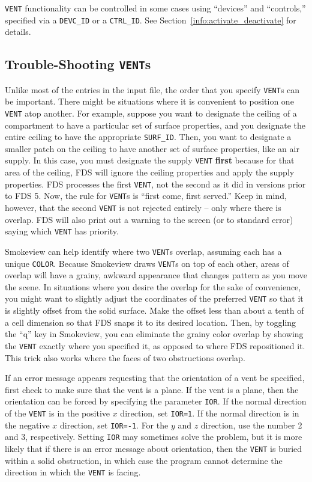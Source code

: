 \documentclass[11pt]{book}
\newcommand{\ct}{\tt\small}
\begin{document}
{\ct VENT} functionality can be controlled in some cases using ``devices'' and ``controls,'' specified via a {\ct DEVC\_ID} or a {\ct CTRL\_ID}.
See Section~\ref{info:activate_deactivate} for details.


\subsection{\texorpdfstring{{Trouble-Shooting {\tt VENT}s}}{Trouble-Shooting VENTs}}
\label{info:VENT_Trouble}

Unlike most of the entries in the input file, the order that you specify {\ct VENT}s can be important. There might be
situations where it is convenient to position one {\ct VENT} atop another. For example, suppose you want to designate the
ceiling of a compartment to have a particular set of surface properties, and you designate the entire ceiling to have the
appropriate {\ct SURF\_ID}. Then, you want to designate a smaller patch on the ceiling to have another set of surface
properties, like an air supply. In this case, you must designate the supply {\ct VENT} {\bf first} because for that area
of the ceiling, FDS will ignore the ceiling properties and apply the supply properties. FDS processes the first {\ct VENT}, not
the second as it did in versions prior to FDS 5. Now, the rule for {\ct VENT}s is ``first come, first served.''
Keep in mind, however, that the
second {\ct VENT} is not rejected entirely -- only where there is overlap. FDS will also print out a warning to the screen (or to
standard error) saying which {\ct VENT} has priority.

Smokeview can help identify where two {\ct VENT}s overlap, assuming each has a unique {\ct COLOR}. Because Smokeview draws {\ct VENT}s
on top of each other, areas of overlap will have a grainy, awkward appearance that changes pattern as you move the scene. In situations
where you desire the overlap for the sake of convenience, you might want to slightly adjust the coordinates of the preferred {\ct VENT}
so that it is slightly offset from the solid surface. Make the offset less than about a tenth of a cell dimension so that FDS snaps it
to its desired location. Then, by toggling the ``q'' key in Smokeview, you can eliminate the grainy color overlap by showing the
{\ct VENT} exactly where you specified it, as opposed to where FDS repositioned it. This trick also works where the faces of two
obstructions overlap.

If an error message appears requesting that
the orientation of a vent be specified, first check to make sure that the vent is a plane.
If the vent is a plane, then the orientation can be forced by specifying the parameter {\ct IOR}.
If the normal direction of the {\ct VENT} is in the positive $x$ direction, set {\ct IOR=1}.
If the normal direction is in the negative $x$ direction, set {\ct IOR=-1}. For the $y$ and
$z$ direction, use the number 2 and 3, respectively. Setting {\ct IOR} may sometimes solve
the problem, but it is more likely that if there is an error message about orientation, then
the {\ct VENT} is buried within a solid obstruction, in which case the program cannot determine
the direction in which the {\ct VENT} is facing.
\end{document}

